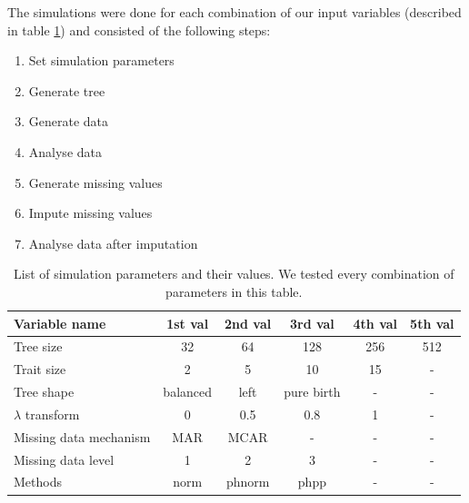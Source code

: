 \documentclass[hidelinks,a4paper]{article}
\begin{document}
\begin{multicols}{2}
The simulations were done for each combination of our input variables (described in table \ref{table:inputVariables}) and consisted of the following steps:

\begin{enumerate}
	\item{Set simulation parameters}
	\item{Generate tree}
	\item{Generate data}
	\item{Analyse data}
	\item{Generate missing values}
	\item{Impute missing values}
	\item{Analyse data after imputation}
\end{enumerate}

\end{multicols}
\begin{table}
	\centering
	\begin{tabular}{ | l | c | c | c | c | c |}
		\hline
		Variable name & 1st val & 2nd val & 3rd val & 4th val & 5th val \\
		\hline
		Tree size & 32 & 64 & 128 & 256 & 512 \\
		Trait size & 2 & 5 & 10 & 15 & - \\
		Tree shape & balanced & left & pure birth & - & - \\
		$\lambda$ transform & 0 & 0.5 & 0.8 & 1 & - \\
		Missing data mechanism & MAR & MCAR & - & - & - \\
		Missing data level & 1 & 2 & 3 & - & - \\
		Methods & norm & phnorm & phpp & - & - \\
		\hline
	\end{tabular}
	\footnotesize
	\caption{List of simulation parameters and their values. We tested every combination of parameters in this table.}
	\label{table:inputVariables}
\end{table}
\end{document}
